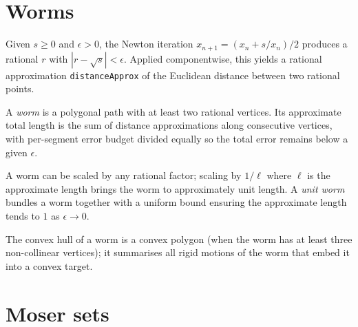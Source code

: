 \chapter{Worms}

\begin{definition}
  \label{def:sqrtApprox}
  \leanok
  Given $s \ge 0$ and $\epsilon > 0$, the Newton iteration
  $x_{n+1} = (x_n + s/x_n)/2$ produces a rational $r$ with
  $|r - \sqrt{s}| < \epsilon$. Applied componentwise, this yields a
  rational approximation \texttt{distanceApprox} of the Euclidean distance
  between two rational points.
\end{definition}

\begin{definition}[Worm]
  \label{def:worm}
  \leanok
  A \emph{worm} is a polygonal path with at least two rational vertices.
  Its approximate total length is the sum of distance approximations along
  consecutive vertices, with per-segment error budget divided equally so
  the total error remains below a given $\epsilon$.
\end{definition}

\begin{definition}
  \label{def:scaleToUnit}
  A worm can be scaled by any rational factor; scaling by $1/\ell$ where
  $\ell$ is the approximate length brings the worm to approximately unit
  length. A \emph{unit worm} bundles a worm together with a uniform bound
  ensuring the approximate length tends to $1$ as $\epsilon \to 0$.
\end{definition}

\begin{definition}
  \label{def:worm-hull}
  The convex hull of a worm is a convex polygon (when the worm has at
  least three non-collinear vertices); it summarises all rigid motions of
  the worm that embed it into a convex target.
\end{definition}

\chapter{Moser sets}

